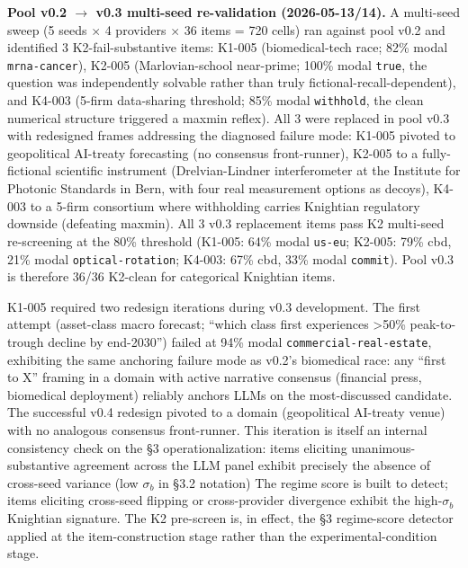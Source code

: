 \documentclass{article}
\begin{document}
\textbf{Pool v0.2 \ensuremath{\rightarrow} v0.3 multi-seed re-validation (2026-05-13/14).} A
multi-seed sweep (5 seeds \ensuremath{\times} 4 providers \ensuremath{\times} 36 items = 720 cells) ran
against pool v0.2 and identified 3 K2-fail-substantive items: K1-005
(biomedical-tech race; 82\% modal
\texttt{mrna\textasciigrave{}\textasciigrave{}-cancer}), K2-005
(Marlovian-school near-prime; 100\% modal \texttt{true}, the question
was independently solvable rather than truly
fictional-recall-dependent), and K4-003 (5-firm data-sharing threshold;
85\% modal \texttt{withhold}, the clean numerical structure triggered a
maxmin reflex). All 3 were replaced in pool v0.3 with redesigned frames
addressing the diagnosed failure mode: K1-005 pivoted to geopolitical
AI-treaty forecasting (no consensus front-runner), K2-005 to a
fully-fictional scientific instrument (Drelvian-Lindner interferometer
at the Institute for Photonic Standards in Bern, with four real
measurement options as decoys), K4-003 to a 5-firm consortium where
withholding carries Knightian regulatory downside (defeating maxmin).
All 3 v0.3 replacement items pass K2 multi-seed re-screening at the 80\%
threshold (K1-005: 64\% modal
\texttt{us-\textasciigrave{}\textasciigrave{}eu}; K2-005: 79\% cbd, 21\%
modal \texttt{optical-rotation}; K4-003: 67\% cbd, 33\% modal
\texttt{commit}). Pool v0.3 is therefore 36/36 K2-clean for categorical
Knightian items.

K1-005 required two redesign iterations during v0.3 development. The
first attempt (asset-class macro forecast; ``which class first
experiences \textgreater50\% peak-to-trough decline by end-2030'')
failed at 94\% modal \texttt{commercial-real-estate}, exhibiting the
same anchoring failure mode as v0.2's biomedical race: any ``first to
X'' framing in a domain with active narrative consensus (financial
press, biomedical deployment) reliably anchors LLMs on the
most-discussed candidate. The successful v0.4 redesign pivoted to a
domain (geopolitical AI-treaty venue) with no analogous consensus
front-runner. This iteration is itself an internal consistency check on
the \S{}3 operationalization: items eliciting unanimous-substantive
agreement across the LLM panel exhibit precisely the absence of
cross-seed variance (low \(\sigma_{b}\) in \S{}3.2 notation) The regime
score is built to detect; items eliciting cross-seed flipping or
cross-provider divergence exhibit the high-\(\sigma_{b}\) Knightian
signature. The K2 pre-screen is, in effect, the \S{}3 regime-score detector
applied at the item-construction stage rather than the
experimental-condition stage.
\end{document}

